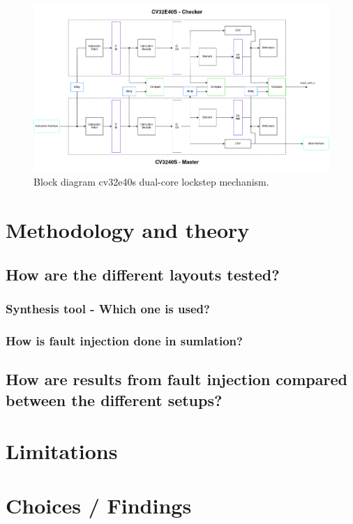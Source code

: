 \begin{figure}[h!]
    \centering
    \includegraphics[width=\textwidth]{docs/images/dual_cores_block.png}
    \caption{Block diagram cv32e40s dual-core lockstep mechanism.}
    \label{fig:dual_block}
\end{figure}

\section{Methodology and theory}
\label{sec:method}

\subsection{How are the different layouts tested?}
\subsubsection{Synthesis tool - Which one is used?}
\subsubsection{How is fault injection done in sumlation?}
\subsection{How are results from fault injection compared between the different setups?}

\section{Limitations}
\label{sec:limit}

\section{Choices / Findings}
\label{sec:choice}